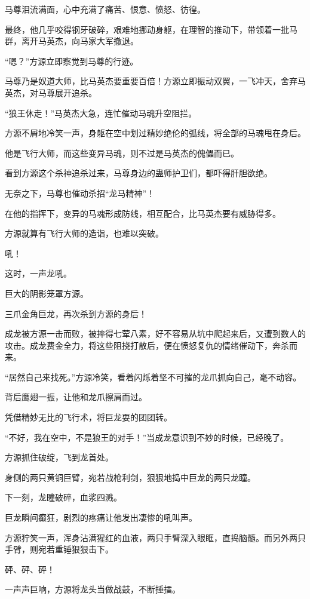 \begin{this_body}
马尊泪流满面，心中充满了痛苦、恨意、愤怒、彷徨。

最终，他几乎咬得钢牙破碎，艰难地挪动身躯，在理智的推动下，带领着一批马群，离开马英杰，向马家大军撤退。

“嗯？”方源立即察觉到马尊的行迹。

马尊乃是奴道大师，比马英杰要重要百倍！方源立即振动双翼，一飞冲天，舍弃马英杰，对马尊展开追杀。

“狼王休走！”马英杰大急，连忙催动马魂升空阻拦。

方源不屑地冷笑一声，身躯在空中划过精妙绝伦的弧线，将全部的马魂甩在身后。

他是飞行大师，而这些变异马魂，则不过是马英杰的傀儡而已。

看到方源这个杀神追杀过来，马尊身边的蛊师护卫们，都吓得肝胆欲绝。

无奈之下，马尊也催动杀招“龙马精神”！

在他的指挥下，变异的马魂形成防线，相互配合，比马英杰要有威胁得多。

方源就算有飞行大师的造诣，也难以突破。

吼！

这时，一声龙吼。

巨大的阴影笼罩方源。

三爪金角巨龙，再次杀到方源的身后！

成龙被方源一击而败，被摔得七荤八素，好不容易从坑中爬起来后，又遭到数人的攻击。成龙费金全力，将这些阻挠打散后，便在愤怒复仇的情绪催动下，奔杀而来。

“居然自己来找死。”方源冷笑，看着闪烁着坚不可摧的龙爪抓向自己，毫不动容。

背后鹰翅一振，让他和龙爪擦肩而过。

凭借精妙无比的飞行术，将巨龙耍的团团转。

“不好，我在空中，不是狼王的对手！”当成龙意识到不妙的时候，已经晚了。

方源抓住破绽，飞到龙首处。

身侧的两只黄铜巨臂，宛若战枪利剑，狠狠地捣中巨龙的两只龙瞳。

下一刻，龙瞳破碎，血浆四溅。

巨龙瞬间癫狂，剧烈的疼痛让他发出凄惨的吼叫声。

方源狞笑一声，浑身沾满猩红的血液，两只手臂深入眼眶，直捣脑髓。而另外两只手臂，则宛若重锤狠狠击下。

砰、砰、砰！

一声声巨响，方源将龙头当做战鼓，不断捶擂。


\end{this_body}
